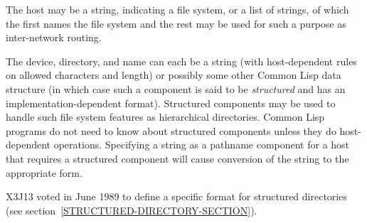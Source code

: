 The host may be a string, indicating a file system, or a list
of strings, of which the first names the file system and the rest
may be used for such a purpose as inter-network routing.

\begin{obsolete}
The device, directory, and name can each be a string (with
host-dependent rules on allowed characters and length) or possibly
some other Common Lisp data structure
(in which case such a component is said to be \emph{structured}
and has an implementation-dependent format).
Structured components may be used to handle such file system features as
hierarchical directories.  Common Lisp programs do not need to know about
structured components unless they do host-dependent operations.
Specifying a string as a pathname component for a host that requires a
structured component will cause conversion of the string to the appropriate
form.
\end{obsolete}

\begin{newer}
X3J13 voted in June 1989 
to define a specific format for structured directories
(see section~\ref{STRUCTURED-DIRECTORY-SECTION}).
\end{newer}


